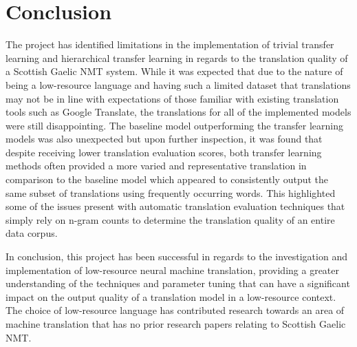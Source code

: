

\section{Conclusion}

The project has identified limitations in the implementation of trivial transfer learning and hierarchical transfer learning in regards to the translation quality of a Scottish Gaelic \acrshort{NMT} system. While it was expected that due to the nature of being a low-resource language and having such a limited dataset that translations may not be in line with expectations of those familiar with existing translation tools such as Google Translate, the translations for all of the implemented models were still disappointing. The baseline model outperforming the transfer learning models was also unexpected but upon further inspection, it was found that despite receiving lower translation evaluation scores, both transfer learning methods often provided a more varied and representative translation in comparison to the baseline model which appeared to consistently output the same subset of translations using frequently occurring words. This highlighted some of the issues present with automatic translation evaluation techniques that simply rely on n-gram counts to determine the translation quality of an entire data corpus.

In conclusion, this project has been successful in regards to the investigation and implementation of low-resource neural machine translation, providing a greater understanding of the techniques and parameter tuning that can have a significant impact on the output quality of a translation model in a low-resource context. The choice of low-resource language has contributed research towards an area of machine translation that has no prior research papers relating to Scottish Gaelic \acrshort{NMT}.